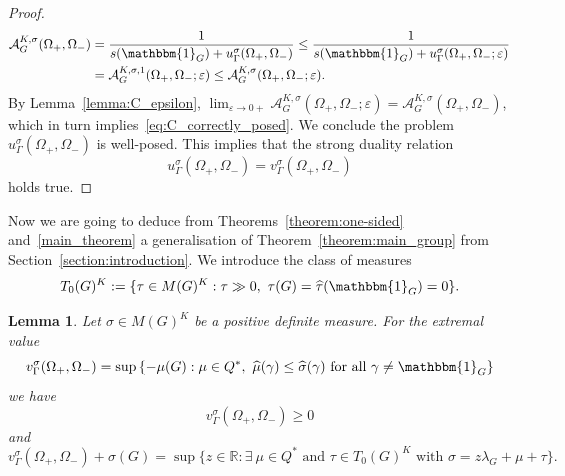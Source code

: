 \documentclass[[a4paper,english,12pt]{amsart}
\theoremstyle{plain}
\newtheorem{lemma}[theorem]{Lemma}
\theoremstyle{remark}
\newcommand{\RR}{\mathbb R}
\begin{document}
\begin{proof}
\begin{align*}
\mathcal{A}^{K,\sigma}_G(\Omega_+, \Omega_{-}) & = \frac{1}{s(\mathbbm{1}_G) + u_\Gamma^{\sigma}(\Omega_+, \Omega_-)} 
\le \frac{1}{s(\mathbbm{1}_G) + u_\Gamma^{\sigma}(\Omega_+, \Omega_-;\varepsilon)} \\
& = \mathcal{A}_G^{K,\sigma,1}(\Omega_+, \Omega_-;\varepsilon) \le \mathcal{A}^{K,\sigma}_G(\Omega_+, \Omega_-;\varepsilon).
\end{align*}
By Lemma~\ref{lemma:C_epsilon},
$\lim_{\varepsilon \to 0+} \mathcal{A}^{K,\sigma}_G(\Omega_+, \Omega_-;\varepsilon) = \mathcal{A}^{K,\sigma}_G(\Omega_+, \Omega_{-})$,
which in turn implies~\eqref{eq:C_correctly_posed}. We conclude the problem $u_\Gamma^{\sigma}(\Omega_+, \Omega_-)$ is well-posed. This implies that the strong duality relation
$$
u_\Gamma^{\sigma}(\Omega_+, \Omega_-) = v_\Gamma^{\sigma}(\Omega_+, \Omega_-)
$$
holds true.

\end{proof}

Now we are going to deduce from Theorems~\ref{theorem:one-sided} and~\ref{main_theorem} a generalisation of Theorem~\ref{theorem:main_group} from Section~\ref{section:introduction}. We introduce the class of measures
$$
T_0(G)^K := \{ \tau \in M(G)^K : \tau \gg 0, \ \tau(G)=\widehat{\tau}(\mathbbm{1}_G) = 0 \}.
$$

\begin{lemma} \label{lemma:dual_formulation}
Let $\sigma \in M(G)^K$ be a positive definite measure. For the extremal value 
\begin{equation} \label{eq:problem_v_copy}
v_\Gamma^{\sigma}(\Omega_+, \Omega_-) 
= \sup \left\{ - \mu(G) : \mu \in Q^*, \ \widehat\mu(\gamma) \le \widehat\sigma(\gamma) \text{ for all } \gamma \ne \mathbbm{1}_G\right\}
\end{equation}
we have
\begin{equation} \label{eq:v_positive}
v_\Gamma^\sigma(\Omega_+,\Omega_-) \ge 0
\end{equation}
and
\begin{equation} \label{eq:lemma_vv}
v_\Gamma^\sigma(\Omega_+,\Omega_-) + \sigma(G) = \sup\{ z \in \RR : \exists \ \mu\in Q^* \text{ and } \tau \in T_0(G)^K
 \text{ with } \sigma = z\lambda_G + \mu + \tau\}. 
\end{equation}
\end{lemma}
\end{document}
